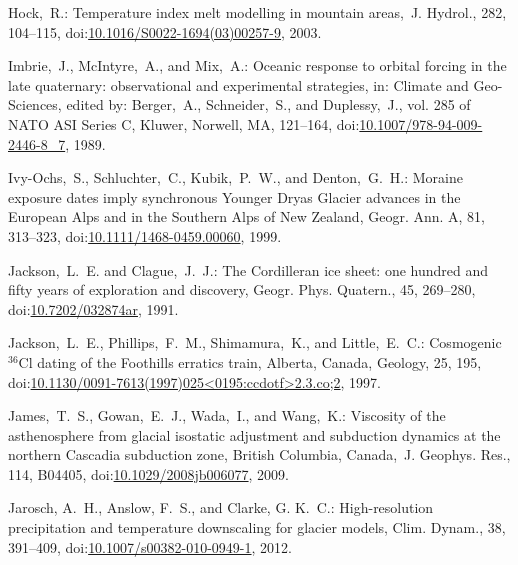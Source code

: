 \documentclass[tc, manuscript]{copernicus}
\begin{document}
\begin{thebibliography}{114}
Hock,~R.: Temperature index melt modelling in mountain areas,~J. Hydrol., 282, 104--115,
doi:\href{http://dx.doi.org/10.1016/S0022-1694(03)00257-9}{10.1016/S0022-1694(03)00257-9}, 2003.


Imbrie,~J., McIntyre,~A., and Mix,~A.: Oceanic response to orbital forcing in the late quaternary: observational and experimental strategies, in: Climate and Geo-Sciences, edited by: Berger,~A., Schneider,~S., and Duplessy,~J., vol. 285 of NATO ASI Series C, Kluwer, Norwell, MA, 121--164,
doi:\href{http://dx.doi.org/10.1007/978-94-009-2446-8_7}{10.1007/978-94-009-2446-8\_7}, 1989.


Ivy-Ochs,~S., Schluchter,~C., Kubik,~P.~W., and Denton,~G.~H.: Moraine
exposure dates imply synchronous Younger Dryas Glacier advances in the
European Alps and in the Southern Alps of New Zealand, Geogr. Ann. A, 81,
313--323,
doi:\href{http://dx.doi.org/10.1111/1468-0459.00060}{10.1111/1468-0459.00060},
1999.


Jackson,~L.~E. and Clague,~J.~J.: The Cordilleran ice sheet: one hundred and fifty years of exploration and discovery, G{e}ogr. Phys. Quatern., 45, 269--280,
doi:\href{http://dx.doi.org/10.7202/032874ar}{10.7202/032874ar}, 1991.


Jackson,~L.~E., Phillips,~F.~M., Shimamura,~K., and Little,~E.~C.: Cosmogenic $^{36}$Cl dating of the Foothills erratics train, Alberta, Canada, Geology, 25, 195,
doi:\href{http://dx.doi.org/10.1130/0091-7613(1997)025<0195:ccdotf>2.3.co;2}{10.1130/0091-7613(1997)025\textless0195:ccdotf\textgreater2.3.co;2}, 1997.


James,~T.~S., Gowan,~E.~J., Wada,~I., and Wang,~K.: Viscosity of the
asthenosphere from glacial isostatic adjustment and subduction dynamics at
the northern Cascadia subduction zone, British Columbia, Canada,~J. Geophys.
Res., 114, B04405,
doi:\href{http://dx.doi.org/10.1029/2008jb006077}{10.1029/2008jb006077},
2009.


Jarosch, A.~H., Anslow, F.~S., and Clarke, G. K.~C.: High-resolution precipitation and temperature downscaling for glacier models, Clim. Dynam., 38, 391--409,
doi:\href{http://dx.doi.org/10.1007/s00382-010-0949-1}{10.1007/s00382-010-0949-1}, 2012.



\end{thebibliography}
\end{document}
